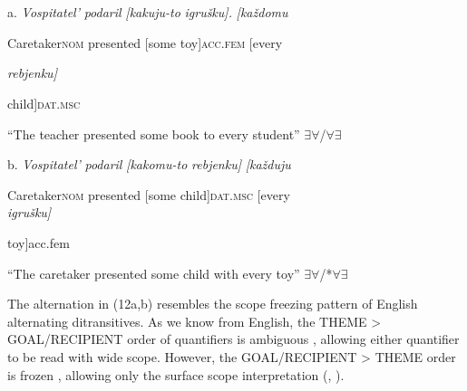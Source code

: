 \documentclass[output=paper,modfonts, nonflat]{langsci/langscibook}
\begin{document}
\begin{styleinnerExample}
\ea%
    \label{ex:key:12}
    \gll\\
        \\
    \glt
    \z

          a.  \textit{Vospitatel’}      \textit{podaril}   \textit{[kakuju-to} \textit{igrušku].}       \textit{[každomu} 
\end{styleinnerExample}

\begin{styleinnerExample}
    Caretaker\textsc{nom} presented   [some       toy]\textsc{acc.fem} [every
\end{styleinnerExample}

\begin{styleinnerExample}
    \textit{rebjenku]}
\end{styleinnerExample}

\begin{styleinnerExample}
    child]\textsc{dat.msc}
\end{styleinnerExample}

\begin{styleinnerExample}
    “The teacher presented some book to every student” ${\exists}{\forall}$/${\forall}{\exists}$
\end{styleinnerExample}

\begin{styleinnerExample}
  b.  \textit{Vospitatel’}       \textit{podaril}   \textit{[kakomu-to} \textit{rebjenku]}    \textit{[každuju} 
\end{styleinnerExample}

\begin{styleinnerExample}
    Caretaker\textsc{nom}  presented   [some        child]\textsc{dat.msc} [every  \\
\textit{igrušku]}
\end{styleinnerExample}

\begin{styleinnerExample}
    toy]acc.fem
\end{styleinnerExample}

\begin{styleinnerExample}
    “The caretaker presented some child with every toy” ${\exists}{\forall}$/*${\forall}{\exists}$
\end{styleinnerExample}

The alternation in (12a,b) resembles the scope freezing pattern of English alternating ditransitives. As we know from English, the THEME  >  GOAL/RECIPIENT order of quantifiers is ambiguous , allowing either quantifier to be read with wide scope. However, the GOAL/RECIPIENT > THEME order is frozen , allowing only the surface scope interpretation (\citealt{Larson1990}, \citealt{Bruening2001}).\\
\end{document}
